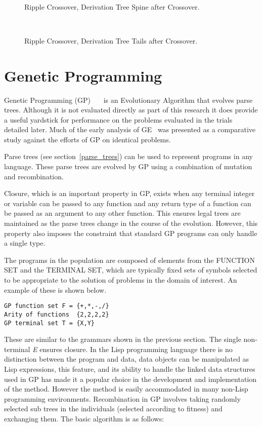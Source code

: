 \begin{figure}[]
\centerline{\hbox{
}}
\caption{\label{ripple2}Ripple Crossover, Derivation Tree Spine after Crossover.}
\end{figure}



\begin{figure}[]
\centerline{\hbox{
}}
\caption{\label{ripple3}Ripple Crossover, Derivation Tree Tails after Crossover.}
\end{figure}


\section{Genetic Programming}
Genetic Programming (GP)~\cite{koza}~\cite{koza1}~\cite{koza2} is an Evolutionary Algorithm that evolves parse trees. Although it is not evaluated directly as part of this research it does provide a useful yardstick for performance on the problems evaluated in the trials detailed later. Much of the early analysis of GE~\cite{ieee2001} was presented as a comparative study against the efforts of GP on identical problems. 

Parse trees (see section~\ref{parse_trees}) can be used to represent programs in any language. These parse trees are evolved by GP using a combination of mutation and recombination. 

Closure, which is an important property in GP, exists when any terminal integer or variable can be passed to any function and any return type of a function can be passed as an argument to any other function. This ensures legal trees are maintained  as the parse trees change in the course of the evolution. However, this property also imposes the constraint that standard GP programs can only handle a single type. 

The programs in the population are composed of elements from the FUNCTION SET and the TERMINAL SET, which are typically fixed sets of symbols selected to be appropriate to the solution of problems in the domain of interest. An example of these is shown below.
\begin{verbatim}
GP function set F = {+,*,-,/}
Arity of functions  {2,2,2,2}
GP terminal set T = {X,Y}
\end{verbatim}

These are similar to the grammars shown in the previous section. The single non-terminal \emph{E} ensures closure.
In the Lisp programming language there is no distinction between the program and data, data objects can be manipulated as Lisp expressions, this feature, and its  ability to handle the linked data structures used in GP has made it a popular choice in the development and implementation of the method. However the method is easily accommodated in many  non-Lisp programming environments.
Recombination in GP involves taking  randomly selected sub trees in the individuals (selected according to fitness) and exchanging them.
The basic algorithm is as follows:

